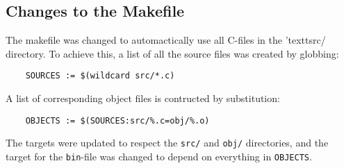 \subsection{Changes to the Makefile}
The makefile was changed to automactically use all C-files in the 'textt{src/} directory.
To achieve this, a list of all the source files was created by globbing:

\begin{verbatim}
    SOURCES := $(wildcard src/*.c)
\end{verbatim}

A list of corresponding object files is contructed by substitution:
\begin{verbatim}
    OBJECTS := $(SOURCES:src/%.c=obj/%.o)
\end{verbatim}

The targets were updated to respect the \texttt{src/} and \texttt{obj/} directories, and the target for the \texttt{bin}-file was changed to depend on everything in \texttt{OBJECTS}.
